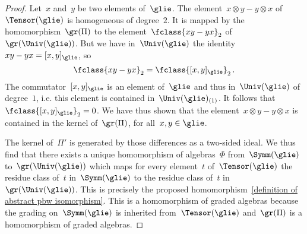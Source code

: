 \begin{proof}
	Let~$x$ and~$y$ be two elements of~$\glie$.
	The element~$x \otimes y - y \otimes x$ of~$\Tensor(\glie)$ is homogeneous of degree~$2$.
	It is mapped by the homomorphism~$\gr(\Pi)$ to the element~$\fclass{ x y - y x }_2$ of~$\gr(\Univ(\glie))$.
	But we have in~$\Univ(\glie)$ the identity~$xy - yx = [x,y]_{\glie}$, so
	\[
		\fclass{ xy - yx }_2
		=
		\fclass{ [x,y]_{\glie} }_2 \,.
	\]
	The commutator~$[x,y]_{\glie}$ is an element of~$\glie$ and thus in~$\Univ(\glie)$ of degree~$1$, i.e. this element is contained in~$\Univ(\glie)_{(1)}$.
	It follows that~$\fclass{ [x,y]_{\glie} }_2 = 0$.
	We have thus shown that the element~$x \otimes y - y \otimes x$ is contained in the kernel of~$\gr(\Pi)$, for all~$x, y \in \glie$.

	The kernel of~$\Pi'$ is generated by those differences as a two-sided ideal.
	We thus find that there exists a unique homomorphism of algebras~$\Phi$ from~$\Symm(\glie)$ to~$\gr(\Univ(\glie))$ which maps for every element~$t$ of~$\Tensor(\glie)$ the residue class of~$t$ in~$\Symm(\glie)$ to the residue class of~$t$ in~$\gr( \Univ(\glie) )$.
	This is precisely the proposed homomorphism~\eqref{definition of abstract pbw isomorphism}.
	This is a homomorphism of graded algebras because the grading on~$\Symm(\glie)$ is inherited from~$\Tensor(\glie)$ and~$\gr(\Pi)$ is a homomorphism of graded algebras.
	

\end{proof}
